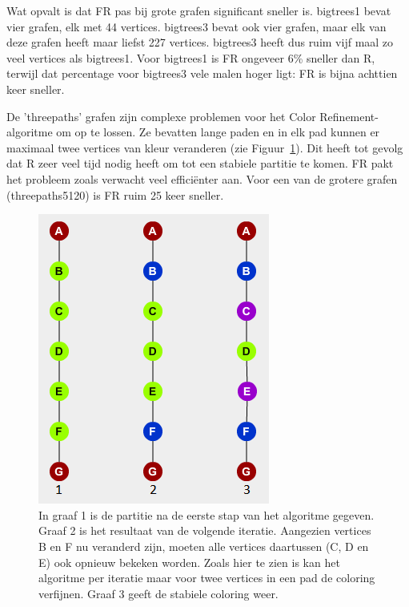 \documentclass[twoside]{article}
\begin{document}
\begin{multicols}{2}
Wat opvalt is dat FR pas bij grote grafen significant sneller is. bigtrees1 bevat vier grafen, elk met 44 vertices. bigtrees3 bevat ook vier grafen, maar elk van deze grafen heeft maar liefst 227 vertices. bigtrees3 heeft dus ruim vijf maal zo veel vertices als bigtrees1. Voor bigtrees1 is FR ongeveer 6\% sneller dan R, terwijl dat percentage voor bigtrees3 vele malen hoger ligt: FR is bijna achttien keer sneller.

De 'threepaths' grafen zijn complexe problemen voor het Color Refinement-algoritme om op te lossen. Ze bevatten lange paden en in elk pad kunnen er maximaal twee vertices van kleur veranderen (zie Figuur~\ref{paths}). Dit heeft tot gevolg dat R zeer veel tijd nodig heeft om tot een stabiele partitie te komen. FR pakt het probleem zoals verwacht veel effici\"enter aan. Voor een van de grotere grafen (threepaths5120) is FR ruim 25 keer sneller.

\begin{figure}[H]
\centering
\includegraphics[]{paths.png}
\caption{In graaf 1 is de partitie na de eerste stap van het algoritme gegeven. Graaf 2 is het resultaat van de volgende iteratie. Aangezien vertices B en F nu veranderd zijn, moeten alle vertices daartussen (C, D en E) ook opnieuw bekeken worden. Zoals hier te zien is kan het algoritme per iteratie maar voor twee vertices in een pad de coloring verfijnen. Graaf 3 geeft de stabiele coloring weer. \label{paths}}
\end{figure}



\end{multicols}
\end{document}
